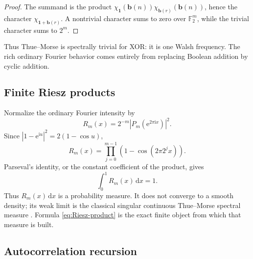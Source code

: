 \documentclass[11pt,oneside]{article}
\theoremstyle{definition}
\theoremstyle{remark}
\newcommand{\Ftwo}{\mathbb F_2}
\newcommand{\e}{\mathrm e}
\newcommand{\ii}{\mathrm i}
\newcommand{\dd}{\,\mathrm d}
\begin{document}
\begin{proof}
The summand is the product \(\chi_{\bm1}(\bm b(n))\chi_{\bm b(r)}(\bm b(n))\), hence the
character \(\chi_{\bm1+\bm b(r)}\).  A nontrivial character sums to zero over \(\Ftwo^m\),
while the trivial character sums to \(2^m\).
\end{proof}

Thus Thue--Morse is spectrally trivial for XOR: it is one Walsh frequency.  The rich ordinary
Fourier behavior comes entirely from replacing Boolean addition by cyclic addition.

\subsection{Finite Riesz products}

Normalize the ordinary Fourier intensity by
\begin{equation}
  R_m(x)=2^{-m}\left|P_m(\e^{2\pi\ii x})\right|^2.          \label{eq:Riesz-def}
\end{equation}
Since \(|1-\e^{\ii u}|^2=2(1-\cos u)\),
\begin{equation}
  \boxed{
  R_m(x)=\prod_{j=0}^{m-1}\left(1-\cos(2\pi2^jx)\right).}  \label{eq:Riesz-product}
\end{equation}
Parseval's identity, or the constant coefficient of the product, gives
\begin{equation}
  \int_0^1R_m(x)\dd x=1.                                   \label{eq:Riesz-mass-one}
\end{equation}
Thus \(R_m(x)\dd x\) is a probability measure.  It does not converge to a smooth density;
its weak limit is the classical singular continuous Thue--Morse spectral measure
\cite{baakegrimm2008,queffelec2010}.  Formula \eqref{eq:Riesz-product} is the exact finite
object from which that measure is built.

\subsection{Autocorrelation recursion}
\end{document}

